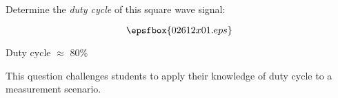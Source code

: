 

Determine the {\it duty cycle} of this square wave signal:

$$\epsfbox{02612x01.eps}$$







Duty cycle $\approx$ 80\%







This question challenges students to apply their knowledge of duty cycle to a measurement scenario.




